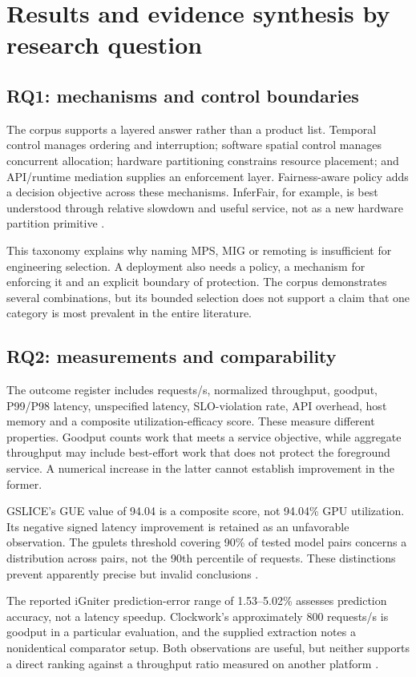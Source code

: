 \section{Results and evidence synthesis by research question}
\subsection{RQ1: mechanisms and control boundaries}
The corpus supports a layered answer rather than a product list. Temporal control manages ordering and interruption; software spatial control manages concurrent allocation; hardware partitioning constrains resource placement; and API/runtime mediation supplies an enforcement layer. Fairness-aware policy adds a decision objective across these mechanisms. InferFair, for example, is best understood through relative slowdown and useful service, not as a new hardware partition primitive \cite{P018}.

This taxonomy explains why naming MPS, MIG or remoting is insufficient for engineering selection. A deployment also needs a policy, a mechanism for enforcing it and an explicit boundary of protection. The corpus demonstrates several combinations, but its bounded selection does not support a claim that one category is most prevalent in the entire literature.

\subsection{RQ2: measurements and comparability}
The outcome register includes requests/s, normalized throughput, goodput, P99/P98 latency, unspecified latency, SLO-violation rate, API overhead, host memory and a composite utilization-efficacy score. These measure different properties. Goodput counts work that meets a service objective, while aggregate throughput may include best-effort work that does not protect the foreground service. A numerical increase in the latter cannot establish improvement in the former.

GSLICE's GUE value of 94.04 is a composite score, not 94.04\% GPU utilization. Its negative signed latency improvement is retained as an unfavorable observation. The gpulets threshold covering 90\% of tested model pairs concerns a distribution across pairs, not the 90th percentile of requests. These distinctions prevent apparently precise but invalid conclusions \cite{P003,P008}.

The reported iGniter prediction-error range of 1.53--5.02\% assesses prediction accuracy, not a latency speedup. Clockwork's approximately 800 requests/s is goodput in a particular evaluation, and the supplied extraction notes a nonidentical comparator setup. Both observations are useful, but neither supports a direct ranking against a throughput ratio measured on another platform \cite{P002,P009}.

